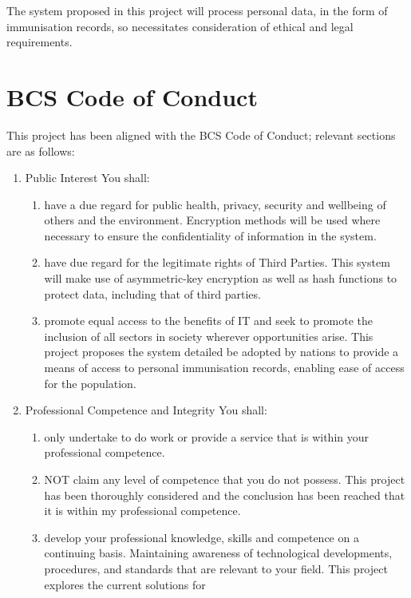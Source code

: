 
 The system proposed in this project will process personal data,
 in the form of immunisation records, so necessitates
 consideration of ethical and legal requirements.

 \section{BCS Code of Conduct}
 This project has been aligned with the BCS Code of Conduct;
 relevant sections are as follows:
 \renewcommand{\labelenumii}{\alph{enumii}}
  \begin{enumerate}
    \item Public Interest
    You shall:
    \begin{enumerate}
      \item have a due regard for public health, privacy,
      security and wellbeing of others and the environment.
      Encryption methods will be used where necessary to
      ensure the confidentiality of information in the
      system.
      \item have due regard for the legitimate rights of Third
      Parties.
      This system will make use of asymmetric-key
      encryption as well as hash functions to protect data,
      including that of third parties.
      \item promote equal access to the benefits of IT and
      seek to promote the inclusion of all sectors in society
      wherever opportunities arise.
      This project proposes the system detailed be adopted
      by nations to provide a means of access to personal
      immunisation records, enabling ease of access for the
      population.
     \end{enumerate}
    \item Professional Competence and Integrity
    You shall:
    \begin{enumerate}
     \item only undertake to do work or provide a service
     that is within your professional competence.
     \item NOT claim any level of competence that you do
     not possess. This project has been thoroughly considered and the
     conclusion has been reached that it is within my
     professional competence.
     \item develop your professional knowledge, skills and
     competence on a continuing basis. Maintaining
     awareness of technological developments,
     procedures, and standards that are relevant to your
     field.
     This project explores the current solutions for

\end{enumerate}
\end{enumerate}
